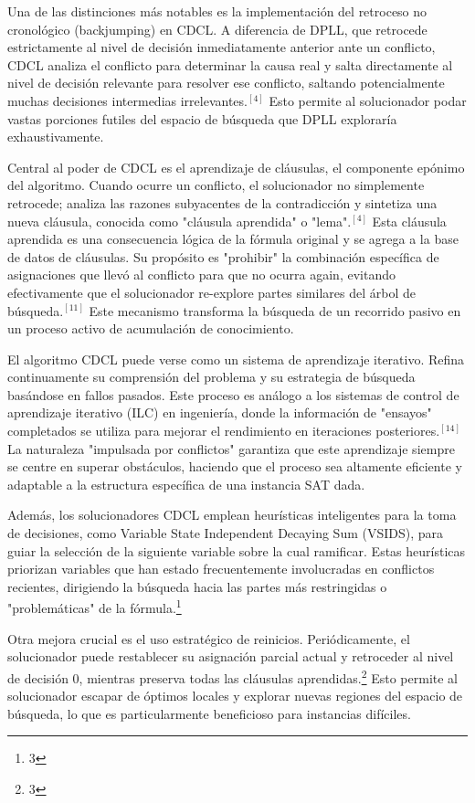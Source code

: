 \documentclass{article}
\begin{document}
Una de las distinciones más notables es la implementación del retroceso no cronológico (backjumping) en CDCL. A diferencia de DPLL, que retrocede estrictamente al nivel de decisión inmediatamente anterior ante un conflicto, CDCL analiza el conflicto para determinar la causa real y salta directamente al nivel de decisión relevante para resolver ese conflicto, saltando potencialmente muchas decisiones intermedias irrelevantes.$^{[4]}$ Esto permite al solucionador podar vastas porciones futiles del espacio de búsqueda que DPLL exploraría exhaustivamente.

Central al poder de CDCL es el aprendizaje de cláusulas, el componente epónimo del algoritmo. Cuando ocurre un conflicto, el solucionador no simplemente retrocede; analiza las razones subyacentes de la contradicción y sintetiza una nueva cláusula, conocida como "cláusula aprendida" o "lema".$^{[4]}$ Esta cláusula aprendida es una consecuencia lógica de la fórmula original y se agrega a la base de datos de cláusulas. Su propósito es "prohibir" la combinación específica de asignaciones que llevó al conflicto para que no ocurra again, evitando efectivamente que el solucionador re-explore partes similares del árbol de búsqueda.$^{[11]}$ Este mecanismo transforma la búsqueda de un recorrido pasivo en un proceso activo de acumulación de conocimiento.

El algoritmo CDCL puede verse como un sistema de aprendizaje iterativo. Refina continuamente su comprensión del problema y su estrategia de búsqueda basándose en fallos pasados. Este proceso es análogo a los sistemas de control de aprendizaje iterativo (ILC) en ingeniería, donde la información de "ensayos" completados se utiliza para mejorar el rendimiento en iteraciones posteriores.$^{[14]}$ La naturaleza "impulsada por conflictos" garantiza que este aprendizaje siempre se centre en superar obstáculos, haciendo que el proceso sea altamente eficiente y adaptable a la estructura específica de una instancia SAT dada.

Además, los solucionadores CDCL emplean heurísticas inteligentes para la toma de decisiones, como Variable State Independent Decaying Sum (VSIDS), para guiar la selección de la siguiente variable sobre la cual ramificar. Estas heurísticas priorizan variables que han estado frecuentemente involucradas en conflictos recientes, dirigiendo la búsqueda hacia las partes más restringidas o "problemáticas" de la fórmula.\footnote{3}

Otra mejora crucial es el uso estratégico de reinicios. Periódicamente, el solucionador puede restablecer su asignación parcial actual y retroceder al nivel de decisión 0, mientras preserva todas las cláusulas aprendidas.\footnote{3} Esto permite al solucionador escapar de óptimos locales y explorar nuevas regiones del espacio de búsqueda, lo que es particularmente beneficioso para instancias difíciles.
\end{document}
